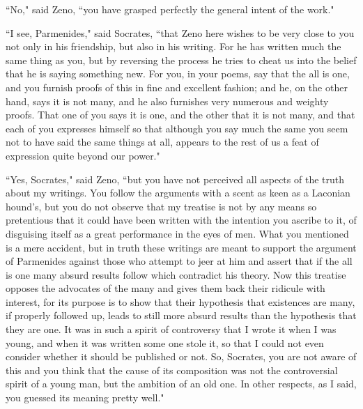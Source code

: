 \documentclass[letterpaper,12pt]{article}
\newcommand{\stephpag}[1]{\marginnote{\small\itshape\fontfamily{ppl}\selectfont #1}}
\begin{document}
``No," said Zeno, ``you have grasped perfectly the general intent of the work."

``I see, Parmenides," said Socrates, ``that Zeno here wishes to be very close to you not only in his friendship, but also in his writing. For he has written much the same thing as you, but by reversing the process he tries to cheat us into the belief that he is saying something new. For you, in your poems, say that the all is one, \stephpag{b} and you furnish proofs of this in fine and excellent fashion; and he, on the other hand, says it is not many, and he also furnishes very numerous and weighty proofs. That one of you says it is one, and the other that it is not many, and that each of you expresses himself so that although you say much the same you seem not to have said the same things at all, appears to the rest of us a feat of expression quite beyond our power."

``Yes, Socrates," said Zeno, ``but you have not perceived all aspects of the truth about my writings. You follow the arguments with a scent \stephpag{c} as keen as a Laconian hound's, but you do not observe that my treatise is not by any means so pretentious that it could have been written with the intention you ascribe to it, of disguising itself as a great performance in the eyes of men. What you mentioned is a mere accident, but in truth these writings are meant to support the argument of Parmenides against those who attempt to jeer at him and assert that \stephpag{d} if the all is one many absurd results follow which contradict his theory. Now this treatise opposes the advocates of the many and gives them back their ridicule with interest, for its purpose is to show that their hypothesis that existences are many, if properly followed up, leads to still more absurd results than the hypothesis that they are one. It was in such a spirit of controversy that I wrote it when I was young, \stephpag{e} and when it was written some one stole it, so that I could not even consider whether it should be published or not. So, Socrates, you are not aware of this and you think that the cause of its composition was not the controversial spirit of a young man, but the ambition of an old one. In other respects, as I said, you guessed its meaning pretty well."
\end{document}
